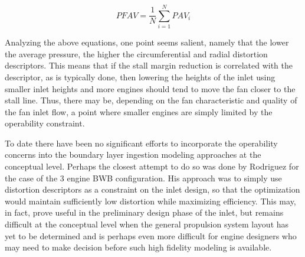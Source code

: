 \begin{equation}
	PFAV = \frac{1}
		         {N} \sum\limits_{i=1}^{N} PAV_i
\label{PFAV}\end{equation}%

Analyzing the above equations, one point seems salient, namely that the lower the average pressure, the higher the circumferential and radial distortion descriptors.  This means that if the stall margin reduction is correlated with the descriptor, as is typically done, then lowering the heights of the inlet using smaller inlet heights and more engines should tend to move the fan closer to the stall line.  Thus, there may be, depending on the fan characteristic and quality of the fan inlet flow, a point where smaller engines are simply limited by the operability constraint. 

\indent To date there have been no significant efforts to incorporate the operability concerns into the boundary layer ingestion modeling approaches at the conceptual level.  Perhaps the closest attempt to do so was done by Rodriguez for the case of the 3 engine BWB configuration.  His approach was to simply use distortion descriptors as a constraint on the inlet design, so that the optimization would maintain sufficiently low distortion while maximizing efficiency.  This may, in fact, prove useful in the preliminary design phase of the inlet, but remains difficult at the conceptual level when the general propulsion system layout has yet to be determined and is perhaps even more difficult for engine designers who may need to make decision before such high fidelity modeling is available.
\vspace{25pt}


